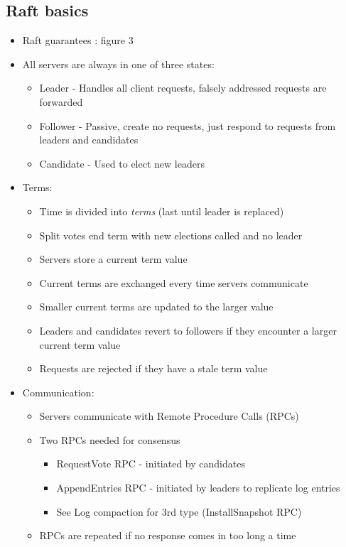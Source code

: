 \documentclass[10pt,a4paper]{article}
\begin{document}
	\subsection{Raft basics}
	\begin{itemize}
		\item Raft guarantees : figure 3
		\item All servers are always in one of three states:
		\begin{itemize}
			\item Leader - Handles all client requests, falsely addressed requests are forwarded
			\item Follower - Passive, create no requests, just respond to requests from leaders and candidates
			\item Candidate - Used to elect new leaders
		\end{itemize}
		\item Terms:
		\begin{itemize}
			\item Time is divided into \textit{terms} (last until leader is replaced)
			\item Split votes end term with new elections called and no leader
			\item Servers store a current term value
			\item Current terms are exchanged every time servers communicate
			\item Smaller current terms are updated to the larger value
			\item Leaders and candidates revert to followers if they encounter a larger current term value
			\item Requests are rejected if they have a stale term value
		\end{itemize}
		\item Communication:
		\begin{itemize}
			\item Servers communicate with Remote Procedure Calls (RPCs)
			\item Two RPCs needed for consensus
			\begin{itemize}
				\item RequestVote RPC - initiated by candidates
				\item AppendEntries RPC - initiated by leaders to replicate log entries
				\item See Log compaction for 3rd type (InstallSnapshot RPC)
			\end{itemize}
			\item RPCs are repeated if no response comes in too long a time
		\end{itemize}
	\end{itemize}
\end{document}
